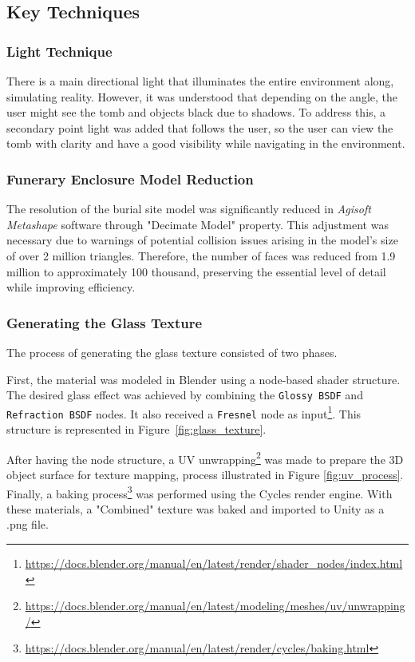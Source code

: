 \subsection{Key Techniques}
\subsubsection{Light Technique}
There is a main directional light that illuminates the entire environment along, simulating reality. However, it was understood that depending on the angle, the user might see the tomb and objects black due to shadows. To address this, a secondary point light was added that follows the user, so the user can view the tomb with clarity and have a good visibility while navigating in the environment.

\subsubsection{Funerary Enclosure Model Reduction}
The resolution of the burial site model was significantly reduced in \emph{Agisoft Metashape} software through "Decimate Model" property.
This adjustment was necessary due to warnings of potential collision issues arising in the model's size of over 2 million triangles. 
Therefore, the number of faces was reduced from 1.9 million to approximately 100 thousand, preserving the essential level of detail while improving efficiency.

\subsubsection{Generating the Glass Texture}
The process of generating the glass texture consisted of two phases.  

First, the material was modeled in Blender using a node-based shader structure. The desired glass effect was achieved by combining the \texttt{Glossy BSDF} and \texttt{Refraction BSDF} nodes. It also received a \texttt{Fresnel} node as input\footnote{\url{https://docs.blender.org/manual/en/latest/render/shader_nodes/index.html}}. This structure is represented in Figure~\ref{fig:glass_texture}.  

After having the node structure, a UV unwrapping\footnote {\url{https://docs.blender.org/manual/en/latest/modeling/meshes/uv/unwrapping/}} was made to prepare the \gls{3D} object surface for texture mapping, process illustrated in Figure \ref{fig:uv_process}.
 Finally, a baking process\footnote{\url{https://docs.blender.org/manual/en/latest/render/cycles/baking.html}} was performed using the Cycles render engine.
With these materials, a "Combined" texture was baked and imported to Unity as a .png file.

